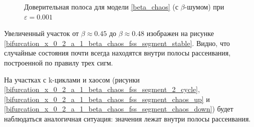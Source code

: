 \begin{figure}
            
        \caption{Доверительная полоса для модели \ref{beta_chaos} (с \(\beta\)-шумом) при \(\varepsilon = 0.001\)}
    \end{figure}

    Увеличенный участок от \(\beta \approx 0.45\) до \(\beta \approx 0.48\) изображен на рисунке \ref{bifurcation_x_0_2_a_1_beta_chaos_fss_segment_stable}. Видно, что случайные состояния почти всегда находятся внутри полосы рассеивания, построенной по правилу трех сигм. 

    На участках с k-циклами и хаосом (рисунки \ref{bifurcation_x_0_2_a_1_beta_chaos_fss_segment_2_cycle}, \ref{bifurcation_x_0_2_a_1_beta_chaos_fss_segment_chaos_up} и \ref{bifurcation_x_0_2_a_1_beta_chaos_fss_segment_chaos_down}) будет наблюдаться аналогичная ситуация: значения лежат внутри полосы рассеивания.
